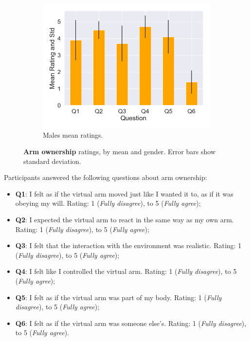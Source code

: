 \begin{figure}[H]
  \hspace{10mm}
 \begin{subfigure}[b]{\textwidth}
 \centering
 \includegraphics[scale=0.5]{Files/Plots/ownership_mean_ratings_m.png}
 \caption{Males mean ratings.}
 \label{fig:ownMale}
 \end{subfigure}
 \caption{\textbf{Arm ownership} ratings, by mean and gender. Error bars show standard deviation.}
\label{fig:ownAll}
\end{figure}
Participants answered the following questions about arm ownership:

\begin{itemize}
\itemsep0em
    \item \textbf{Q1}: I felt as if the virtual arm moved just like I wanted it to, as if it was obeying my will. Rating: 1 (\textit{Fully disagree}), to 5 (\textit{Fully agree});
    \item \textbf{Q2}: I expected the virtual arm to react in the same way as my own arm. Rating: 1 (\textit{Fully disagree}), to 5 (\textit{Fully agree});
    \item \textbf{Q3}: I felt that the interaction with the environment was realistic. Rating: 1 (\textit{Fully disagree}), to 5 (\textit{Fully agree});
    \item \textbf{Q4}: I felt like I controlled the virtual arm. Rating: 1 (\textit{Fully disagree}), to 5 (\textit{Fully agree});
    \item \textbf{Q5}: I felt as if the virtual arm was part of my body. Rating: 1 (\textit{Fully disagree}), to 5 (\textit{Fully agree});
    \item \textbf{Q6}: I felt as if the virtual arm was someone else’s. Rating: 1 (\textit{Fully disagree}), to 5 (\textit{Fully agree}).
\end{itemize}

